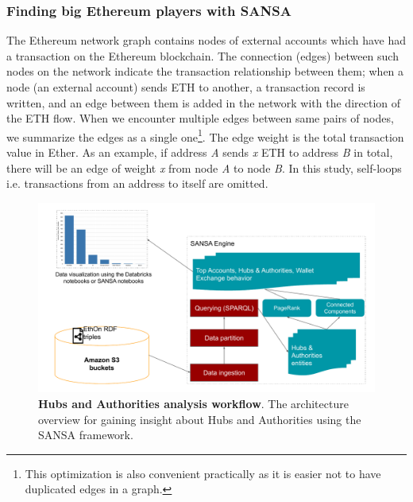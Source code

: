 \subsubsection{Finding big Ethereum players with SANSA}
The Ethereum network graph contains nodes of external accounts which have had a transaction on the Ethereum blockchain.
The connection (edges) between such nodes on the network indicate the transaction relationship between them; when a node (an external account) sends \gls{ETH} to another, a transaction record is written, and an edge between them is added in the network with the direction of the \gls{ETH} flow. When we encounter multiple edges between same pairs of nodes, we summarize the edges as a single one\footnote{This optimization is also convenient practically as it is easier not to have duplicated edges in a graph.}. The edge weight is the total transaction value in Ether.
As an example, if address \emph{A} sends \emph{x} \gls{ETH} to address \emph{B} in total, there will be an edge of weight \emph{x} from node \emph{A} to node \emph{B}. 
In this study, self-loops i.e. transactions from an address to itself are omitted.

\begin{figure}
\centering
\includegraphics[width=1.0\columnwidth]{images/7_implemenation_and_usecases/hub-and-authorities-system-architecture.pdf}
\caption{\textbf{Hubs and Authorities analysis workflow}.
The architecture overview for gaining insight about Hubs and Authorities using the SANSA framework.}
\label{fig:hub-and-authorities-system-architecture}
\end{figure}

